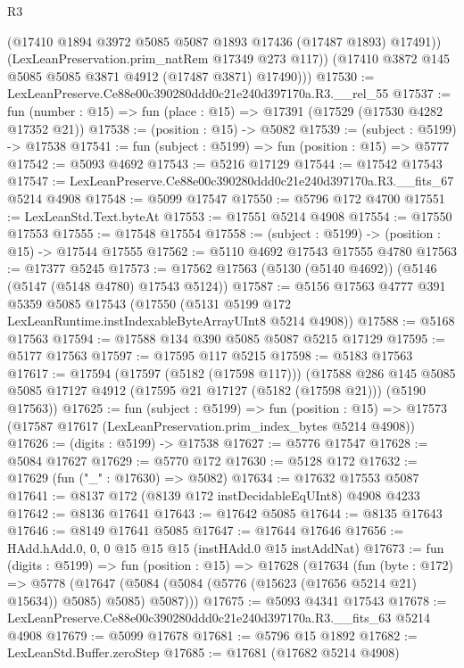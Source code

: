 \begin{lexlean}{R3}
\begin{coremodule}
            (@17410 @1894 @3972 @5085 @5087 @1893 @17436 (@17487 @1893) @17491))
          (LexLeanPreservation.prim_natRem @17349 @273 @117))
        (@17410 @3872 @145 @5085 @5085 @3871 @4912 (@17487 @3871) @17490)))
@17530 := LexLeanPreserve.Ce88e00c390280ddd0c21e240d397170a.R3.__rel_55
@17537 := fun (number : @15) => fun (place : @15) => @17391 (@17529 (@17530 @4282 @17352 @21))
@17538 := (position : @15) -> @5082
@17539 := (subject : @5199) -> @17538
@17541 := fun (subject : @5199) => fun (position : @15) => @5777
@17542 := @5093 @4692
@17543 := @5216 @17129
@17544 := @17542 @17543
@17547 := LexLeanPreserve.Ce88e00c390280ddd0c21e240d397170a.R3.__fits_67 @5214 @4908
@17548 := @5099 @17547
@17550 := @5796 @172 @4700
@17551 := LexLeanStd.Text.byteAt
@17553 := @17551 @5214 @4908
@17554 := @17550 @17553
@17555 := @17548 @17554
@17558 := (subject : @5199) -> (position : @15) -> @17544 @17555
@17562 := @5110 @4692 @17543 @17555 @4780
@17563 := @17377 @5245
@17573 := @17562 @17563 (@5130 (@5140 @4692)) (@5146 (@5147 (@5148 @4780) @17543 @5124))
@17587 := @5156
    @17563
    @4777
    @391
    @5359
    @5085
    @17543
    (@17550 (@5131 @5199 @172 LexLeanRuntime.instIndexableByteArrayUInt8 @5214 @4908))
@17588 := @5168 @17563
@17594 := @17588 @134 @390 @5085 @5087 @5215 @17129
@17595 := @5177 @17563
@17597 := @17595 @117 @5215
@17598 := @5183 @17563
@17617 := @17594
    (@17597 (@5182 (@17598 @117)))
    (@17588
      @286
      @145
      @5085
      @5085
      @17127
      @4912
      (@17595 @21 @17127 (@5182 (@17598 @21)))
      (@5190 @17563))
@17625 := fun (subject : @5199) =>
  fun (position : @15) => @17573 (@17587 @17617 (LexLeanPreservation.prim_index_bytes @5214 @4908))
@17626 := (digits : @5199) -> @17538
@17627 := @5776 @17547
@17628 := @5084 @17627
@17629 := @5770 @172
@17630 := @5128 @172
@17632 := @17629 (fun ("_" : @17630) => @5082)
@17634 := @17632 @17553 @5087
@17641 := @8137 @172 (@8139 @172 instDecidableEqUInt8) @4908 @4233
@17642 := @8136 @17641
@17643 := @17642 @5085
@17644 := @8135 @17643
@17646 := @8149 @17641 @5085
@17647 := @17644 @17646
@17656 := HAdd.hAdd.{0, 0, 0} @15 @15 @15 (instHAdd.{0} @15 instAddNat)
@17673 := fun (digits : @5199) =>
  fun (position : @15) =>
  @17628
    (@17634
      (fun (byte : @172) =>
      @5778 (@17647 (@5084 (@5084 (@5776 (@15623 (@17656 @5214 @21) @15634)) @5085) @5085) @5087)))
@17675 := @5093 @4341 @17543
@17678 := LexLeanPreserve.Ce88e00c390280ddd0c21e240d397170a.R3.__fits_63 @5214 @4908
@17679 := @5099 @17678
@17681 := @5796 @15 @1892
@17682 := LexLeanStd.Buffer.zeroStep
@17685 := @17681 (@17682 @5214 @4908)

\end{coremodule}
\end{lexlean}
